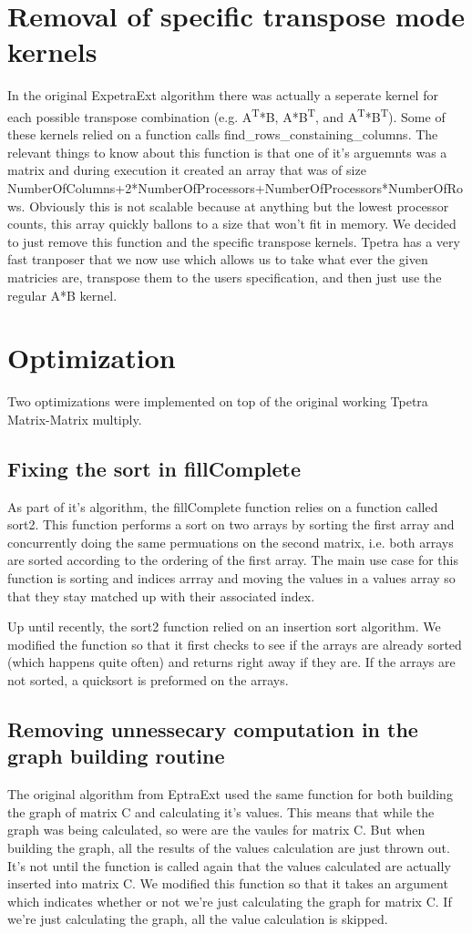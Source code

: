 \documentclass{article}
\newcommand{\mahts}[1]{\textsuperscript{#1}}
\begin{document}
\section{Removal of specific transpose mode kernels}
In the original ExpetraExt algorithm there was actually a seperate kernel for each possible transpose combination (e.g. A\mahts{T}*B, A*B\mahts{T}, and A\mahts{T}*B\mahts{T}).
Some of these kernels relied on a function calls find\_rows\_constaining\_columns. The relevant things to know about this function is that one of it's
arguemnts was a matrix and during execution it created an array that was of size NumberOfColumns+2*NumberOfProcessors+NumberOfProcessors*NumberOfRows.
Obviously this is not scalable because at anything but the lowest processor counts, this array quickly ballons to a size that won't fit in memory. We 
decided to just remove this function and the specific transpose kernels. Tpetra has a very fast tranposer that we now use which allows us to take
what ever the given matricies are, transpose them to the users specification, and then just use the regular A*B kernel.

\section{Optimization}
Two optimizations were implemented on top of the original working Tpetra Matrix-Matrix multiply.
\subsection{Fixing the sort in fillComplete}
As part of it's algorithm, the fillComplete function relies on a function called sort2. This function performs a sort on two arrays by sorting the first
array and concurrently doing the same permuations on the second matrix, i.e. both arrays are sorted according to the ordering of the first array. The main
use case for this function is sorting and indices arrray and moving the values in a values array so that they stay matched up with their associated index.

Up until recently, the sort2 function relied on an insertion sort algorithm. We modified the function so that it first checks to see if the arrays are 
already sorted (which happens quite often) and returns right away if they are. If the arrays are not sorted, a quicksort is preformed on the arrays.

\subsection{Removing unnessecary computation in the graph building routine}
The original algorithm from EptraExt used the same function for both building the graph of matrix C and calculating it's values. This means that while
the graph was being calculated, so were are the vaules for matrix C. But when building the graph, all the results of the values calculation are just thrown
out. It's not until the function is called again that the values calculated are actually inserted into matrix C. We modified this function so that it
takes an argument which indicates whether or not we're just calculating the graph for matrix C. If we're just calculating the graph, all the value 
calculation is skipped.
\end{document}
